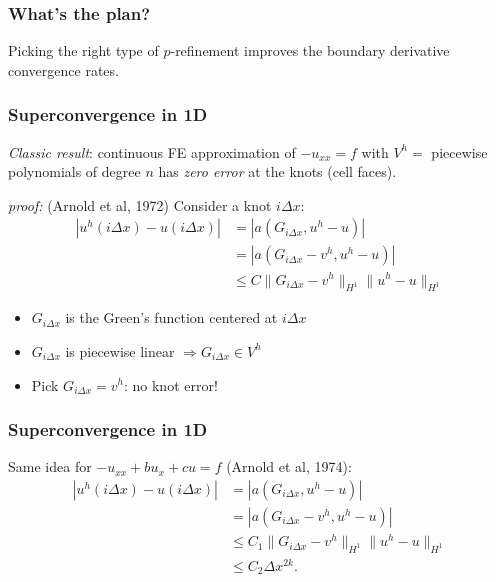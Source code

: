\documentclass[8pt]{beamer}
\begin{document}
\begin{frame}
    \frametitle{What's the plan?}
    \begin{center}
        Picking the right type of \(p\)-refinement improves the boundary
        derivative convergence rates.
    \end{center}
\end{frame}

\begin{frame}
    \frametitle{Superconvergence in 1D}
    \emph{Classic result}: continuous FE approximation of \(-u_{xx} = f\) with
    \(V^h =\) piecewise polynomials of degree \(n\) has \emph{zero error} at the
    knots (cell faces).                                                       \\

    \pause

    \emph{proof:} (Arnold et al, 1972) Consider a knot \(i \Delta x\):
    \begin{align*}
        |u^h(i \Delta x) - u(i \Delta x)|
        &= |a(G_{i\Delta x}, u^h - u)|                                        \\
        &= |a(G_{i\Delta x} - v^h, u^h - u)|                                  \\
        &\leq C \|G_{i\Delta x} - v^h\|_{H^1} \|u^h - u\|_{H^1}
    \end{align*}
    \pause
    \begin{itemize}
        \item \(G_{i\Delta x}\) is the Green's function centered at \(i \Delta
              x\)
        \item \(G_{i \Delta x}\) is piecewise linear
              \(\Rightarrow G_{i\Delta x} \in V^h\)
        \item Pick \(G_{i\Delta x} = v^h\): no knot error!
    \end{itemize}
\end{frame}

\begin{frame}
    \frametitle{Superconvergence in 1D}
    Same idea for \(-u_{xx} + b u_x + c u = f\) (Arnold et al, 1974):
    \pause
    \begin{align*}
        |u^h(i \Delta x) - u(i \Delta x)|
        &= |a(G_{i\Delta x}, u^h - u)|                                        \\
        &= |a(G_{i\Delta x} - v^h, u^h - u)|                                  \\
        &\leq C_1 \|G_{i\Delta x} - v^h\|_{H^1} \|u^h - u\|_{H^1}             \\
        &\leq C_2 \Delta x^{2 k}.
    \end{align*}
\end{frame}
\end{document}
